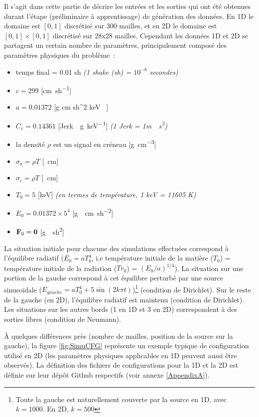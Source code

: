 Il s'agit dans cette partie de décrire les entrées et les sorties qui ont été obtenues durant l'étape (préliminaire à apprentissage) de génération des données. En 1D le domaine est $[0,1]$ discrétisé sur 300 mailles, et en 2D le domaine est $[0,1] \times [0,1]$ discrétisé sur 28x28 mailles. Cependant les données 1D et 2D se partagent un certain nombre de paramètres, principalement composé des paramètres physiques du problème :
\begin{itemize}
  \item temps final = 0.01 \si{sh} \textit{(1 shake (\si{sh}) = $10^{-8}$ secondes)}
  \item $c = 299$ [\si{\cm \per sh}]
  \item $a = 0.01372$ [\si{g \per cm \per sh^2  \per keV }]
  \item $C_v = 0.14361$ [\si{Jerk \per\g \per keV}] \textit{(1 \si{Jerk} = 1\si{m \per \s\cubed})}
  \item la densité $\rho$ est un signal en créneau [\si{\g\per\cm\cubed}]
  \item $\sigma_a = \rho T$ [\si{\per\cm}]
  \item $\sigma_c = \rho T$ [\si{\per\cm}]
  \item $T_0 = 5$ [\si{keV}] \textit{(en termes de température, 1 \si{keV} = 11605 \si{K})}
  \item $E_0 = 0.01372\times 5^4$ [\si{g \per \cm \per sh^2}]
  \item $\mathbf{F}_0 = \mathbf{0}$ [\si{g \per sh^2}]
\end{itemize}

La situation initiale pour chacune des simulations effectuées correspond à l'équilibre radiatif ($E_0=aT_0^4$, i.e température initiale de la matière ($T_0$) = température initiale de la radiation ($Tr_0$) = $(E_0/a)^{1/4}$). La situation sur une portion de la gauche correspond à cet équilibre perturbé par une source sinusoïdale ($ E_{gauche} = aT_{0}^4 + 5 \sin (2 k \pi t) $)\footnote{Toute la gauche est naturellement couverte par la source en 1D, avec $k=1000$. En 2D, $k=500$} (condition de Dirichlet). Sur le reste de la gauche (en 2D), l'équilibre radiatif est maintenu (condition de Dirichlet). Les situations sur les autres bords (1 en 1D et 3 en 2D) correspondent à des sorties libres (condition de Neumann).

À quelques différences près (nombre de mailles, position de la source sur la gauche), la figure \ref{fig:SimuCFG} représente un exemple typique de configuration utilisé en 2D (les paramètres physiques applicables en 1D peuvent aussi être observés). La définition des fichiers de configurations pour la 1D et la 2D est définie sur leur dépôt Github respectifs (voir annexe \ref{AppendixA}).


